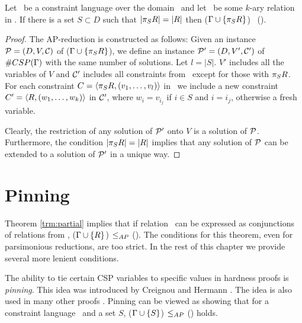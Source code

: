 \begin{lemma} \label{lem:projection}
Let \mrelset\ be a constraint language over the domain \mD\ and
 let \mR\ be some \(k\)-ary relation in \mrelset\@.
If there is a set \(S\subset D\) such that \(|\pi_{S}{R}|=|R|\) then 
\ccsp(\(\Gamma \cup \{{\pi_{S}{R}}\}\)) \maple\ \ccsp(\mrelset)\@.
\end{lemma}

\begin{proof}
The AP-reduction is constructed as follows: Given an instance \(\mathcal{P}=(D,V,\mathcal{C})\)
of \ccsp(\(\Gamma\cup \{\pi_{S}{R}\}\)), we define an 
instance \(\mathcal{P}'=(D,V',\mathcal{C}')\) of \(\#CSP(\Gamma)\) with the same number of solutions.
Let \(l=|S|\)\@. \(V'\) includes all the variables of \(V\) and
\(\mathcal{C}'\) includes all constraints from \mconset\ except for those with \(\pi_{S}{R}\). For each
constraint \(C=\langle \pi_{S}{R},(v_1,\dotsc,v_l) \rangle\) in \mconset\ 
we include a new constraint \(C'=\langle R,(w_1,\dotsc,w_k) \rangle\) in \(\mathcal{C}'\), where 
\(w_i=v_{i_j}\) if \(i\in S\) and \(i=i_j\), otherwise a fresh variable.

Clearly, the restriction of any solution of \(\mathcal{P}'\) onto \(V\) is a solution of \(\mathcal{P}\)\@.
Furthermore, the condition \(|\pi_{S}{R}|=|R|\) implies that any solution of \(\mathcal{P}\)
can be extended to a solution of \(\mathcal{P}'\) in a unique way.
\end{proof}


\section{Pinning}
Theorem \ref{trm:partial} implies that if relation \mR\ can be expressed as conjunctions 
of relations from \mrelset, \ccsp(\(\Gamma \cup \{{R}\}\)) \(\le_{AP}\) \ccsp(\mrelset)\@.
The conditions for this theorem, even for parsimonious reductions, are too strict. 
In the rest of this chapter we provide several more lenient conditions.

The ability to tie certain CSP variables to specific values in hardness proofs is 
\emph{pinning}\@. This idea was introduced by Creignou and Hermann \cite{Nadia}. The idea
is also used in many other proofs \cite{bulatov07,Dyer,Trichotomy,madu}. Pinning can be
viewed as showing that for a constraint language \mrelset\ and a set \(S\), 
\ccsp(\(\Gamma \cup \{{S}\}\)) \(\le_{AP}\) \ccsp(\mrelset) holds.

